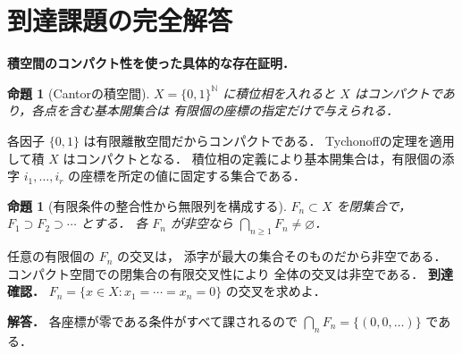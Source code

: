 \documentclass[a5paper,10pt,onecolumn]{jsarticle}
\makeatletter
\theoremstyle{mathnotetheorem}
\newtheorem{proposition}[theorem]{命題}
\renewcommand{\proofname}{証明}
\renewenvironment{proof}[1][\proofname]{%
  \par\pushQED{\qed}\normalfont\topsep4\p@\@plus2\p@\relax
  \trivlist\item[\hskip\labelsep\bfseries #1]\ignorespaces
}{\popQED\endtrivlist\@endpefalse}
\makeatother
\begin{document}
\section{到達課題の完全解答}
\noindent\textbf{積空間のコンパクト性を使った具体的な存在証明．}
\begin{proposition}[Cantorの積空間]
$X=\{0,1\}^{\mathbb N}$ に積位相を入れると
$X$ はコンパクトであり，各点を含む基本開集合は
有限個の座標の指定だけで与えられる．
\end{proposition}
\begin{proof}
各因子 $\{0,1\}$ は有限離散空間だからコンパクトである．
Tychonoffの定理を適用して積 $X$ はコンパクトとなる．
積位相の定義により基本開集合は，有限個の添字
$i_1,\ldots,i_r$ の座標を所定の値に固定する集合である．
\end{proof}
\begin{proposition}[有限条件の整合性から無限列を構成する]
$F_n\subset X$ を閉集合で，
$F_1\supset F_2\supset\cdots$ とする．
各 $F_n$ が非空なら $\bigcap_{n\ge1}F_n\ne\varnothing$．
\end{proposition}
\begin{proof}
任意の有限個の $F_n$ の交叉は，
添字が最大の集合そのものだから非空である．
コンパクト空間での閉集合の有限交叉性により
全体の交叉は非空である．
\end{proof}
\noindent\textbf{到達確認．}
$F_n=\{x\in X:x_1=\cdots=x_n=0\}$ の交叉を求めよ．
\par\noindent\textbf{解答．}
各座標が零である条件がすべて課されるので
$\bigcap_nF_n=\{(0,0,\ldots)\}$ である．
\end{document}
